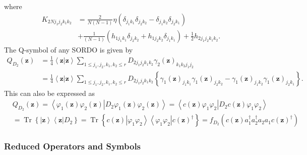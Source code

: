 \documentclass[aps,preprint]{revtex4}%
\begin{document}
where%
\begin{align}
K_{2Nj_{1}j_{2}k_{1}k_{2}}  &  =\frac{2}{N\left(  N-1\right)  }\eta\left(
\delta_{j_{1}k_{1}}\delta_{j_{2}k_{2}}-\delta_{j_{1}k_{2}}\delta_{j_{2}k_{1}%
}\right) \nonumber\\
&  +\frac{1}{\left(  N-1\right)  }\left(  h_{1j_{1}k_{1}}\delta_{j_{2}k_{2}%
}+h_{1j_{2}k_{2}}\delta_{j_{1}k_{1}}\right)  +\frac{1}{2}h_{2j_{1}j_{2}%
k_{1}k_{2}}.
\end{align}
The Q-symbol of any SORDO is given by
\begin{align}
Q_{D_{2}}\left(  \mathbf{z}\right)   &  =\frac{1}{4}\left\langle
\mathbf{z}\left\vert \mathbf{z}\right.  \right\rangle \sum_{1\leq j_{1}%
,j_{2},k_{1},k_{2}\leq r}D_{2j_{1}j_{2}k_{1}k_{2}}\gamma_{2}\left(
\mathbf{z}\right)  _{k_{1}k_{2}j_{1}j_{2}}\nonumber\\
&  =\frac{1}{4}\left\langle \mathbf{z}\left\vert \mathbf{z}\right.
\right\rangle \sum_{1\leq j_{1},j_{2},k_{1},k_{2}\leq r}D_{2j_{1}j_{2}%
k_{1}k_{2}}\left\{  \gamma_{1}\left(  \mathbf{z}\right)  _{j_{1}k_{1}}%
\gamma_{1}\left(  \mathbf{z}\right)  _{j_{2}k_{2}}-\gamma_{1}\left(
\mathbf{z}\right)  _{j_{1}k_{2}}\gamma_{1}\left(  \mathbf{z}\right)
_{j_{2}k_{1}}\right\}  .
\end{align}
This can also be expressed as
\begin{align}
&  Q_{D_{2}}\left(  \mathbf{z}\right)  =\left\langle \varphi_{1}\left(
\mathbf{z}\right)  \varphi_{2}\left(  \mathbf{z}\right)  \left\vert
D_{2}\varphi_{1}\left(  \mathbf{z}\right)  \varphi_{2}\left(  \mathbf{z}%
\right)  \right.  \right\rangle =\left\langle c\left(  \mathbf{z}\right)
\varphi_{1}\varphi_{2}\left\vert D_{2}c\left(  \mathbf{z}\right)  \varphi
_{1}\varphi_{2}\right.  \right\rangle \nonumber\\
&  =\operatorname*{Tr}\left\{  \left\vert \mathbf{z}\right\rangle \left\langle
\mathbf{z}\right\vert D_{2}\right\}  =\operatorname*{Tr}\left\{  c\left(
\mathbf{z}\right)  \left\vert \varphi_{1}\varphi_{2}\right\rangle \left\langle
\varphi_{1}\varphi_{2}\right\vert c\left(  \mathbf{z}\right)  ^{\dagger
}\right\}  =f_{D_{2}}\left(  c\left(  \mathbf{z}\right)  a_{1}^{\dagger}%
a_{2}^{\dagger}a_{2}a_{1}c\left(  \mathbf{z}\right)  ^{\dagger}\right)
\end{align}


\subsubsection{Reduced Operators and Symbols}%
\end{document}
